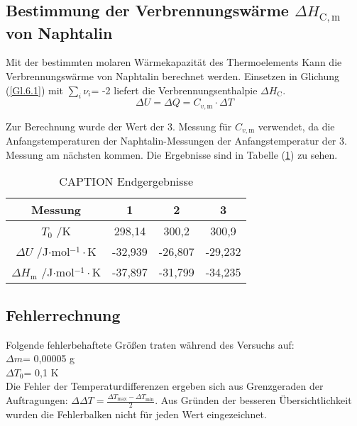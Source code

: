 \documentclass[12pt,a4paper,titlepage,headinclude,bibtotoc]{scrartcl}
\begin{document}
\subsection{Bestimmung der Verbrennungswärme $\Delta H_\mathrm{C,m}$ von Naphtalin}

Mit der bestimmten molaren Wärmekapazität des Thermoelements Kann die Verbrennungswärme von Naphtalin berechnet werden. Einsetzen in Glichung (\ref{Gl.6.1}) mit $\sum_i \nu_i$= -2 liefert die Verbrennungsenthalpie $\Delta H_\mathrm{C}$.\\

\begin{equation}
\Delta U= \Delta Q= C_{v,\mathrm{m}}\cdot \Delta T
\end{equation}

Zur Berechnung wurde der Wert der 3. Messung für $C_{v,\mathrm{m}}$ verwendet, da die Anfangstemperaturen der Naphtalin-Messungen der Anfangstemperatur der 3. Messung am nächsten kommen. Die Ergebnisse sind in Tabelle (\ref{Endergebnisse}) zu sehen.\\

\begin{table} \caption{CAPTION Endgergebnisse} \label{Endergebnisse}
\begin{tabular}{c|c|c|c}
Messung & 1 & 2 & 3 \\ 
\hline 
$T_0$ /K &298,14&300,2&300,9\\
\hline 
$\Delta U$ /J$\cdot$mol$^{-1}\cdot$K &-32,939&-26,807&-29,232\\ 
\hline 
$\Delta H_\mathrm{m}$ /J$\cdot$mol$^{-1}\cdot$K &-37,897&-31,799&-34,235\\
\end{tabular} 
\end{table}
\FloatBarrier

\subsection{Fehlerrechnung}
Folgende fehlerbehaftete Größen traten während des Versuchs auf:\\
 $\Delta m$= 0,00005 g\\
 $\Delta T_0$= 0,1 K\\
 
Die Fehler der Temperaturdifferenzen ergeben sich aus Grenzgeraden der Auftragungen: $\Delta \Delta T= \frac{\Delta T_\mathrm{max}-\Delta T_\mathrm{min}}{2} $. Aus Gründen der besseren Übersichtlichkeit wurden die Fehlerbalken nicht für jeden Wert eingezeichnet.\\
\end{document}
